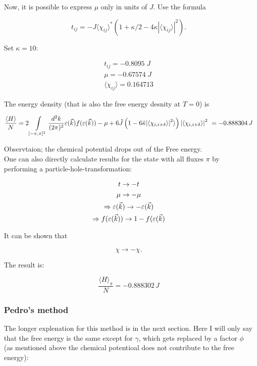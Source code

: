 \documentclass[../../../maim.tex]{subfiles}
\begin{document}
Now, it is possible to express $\mu$ only in units of $J$. Use the formula

\begin{equation}
	t_{ij} = -J \langle\chi_{ij}\rangle^* (1 + \kappa/2 - 4 \kappa \left|\langle\chi_{ij}\rangle \right|^2).
\end{equation}

Set $\kappa = 10$:

\begin{gather}
	t_{ij} = -0.8095 \; J \\
	\mu = -0.67574 \; J \\
	\langle \chi_{ij} \rangle = 0.164713
\end{gather}

The energy density (that is also the free energy desnity at $T=0$) is  

\begin{equation}
	\frac{\langle H \rangle}{N} = 2\int\limits_{[-\pi,\pi]^2}\frac{d^2k}{(2\pi)^2} \varepsilon(\vec{k}) f(\varepsilon(\vec{k})) - \mu + 6 \tilde{J}\left(1-6\tilde{\kappa}\abs{\langle\chi_{i,i+\delta}\rangle}^2\rangle\right)\abs{\langle\chi_{i,i+\delta}\rangle}^2
\ = -0.888304 \, J
\end{equation}

Observtaion; the chemical potential drops out of the Free energy. \\ 

One can also directly calculate results for the state with all fluxes $\pi$ by performing a particle-hole-transformation:

\begin{gather}
	t \rightarrow -t \notag \\
	\mu \rightarrow -\mu \\
	\Rightarrow \varepsilon(\vec{k}) \rightarrow -\varepsilon(\vec{k}) \\
	\Rightarrow f(\varepsilon(\vec{k})) \rightarrow 1-f(\varepsilon(\vec{k})
\end{gather}

It can be shown that

\begin{equation}
\chi \rightarrow -\chi.
\end{equation}

The result is:

\begin{equation}
	\frac{\langle H \rangle_\pi}{N} = -0.888302 \, J
\end{equation}

\subsubsection{Pedro's method}

The longer explenation for this method is in the next section. Here I will only say that the free energy is the same except for $\gamma$, which gets replaced by a factor $\phi$ (as mentioned above the chemical potentioal does not contribute to the free energy):
\end{document}
